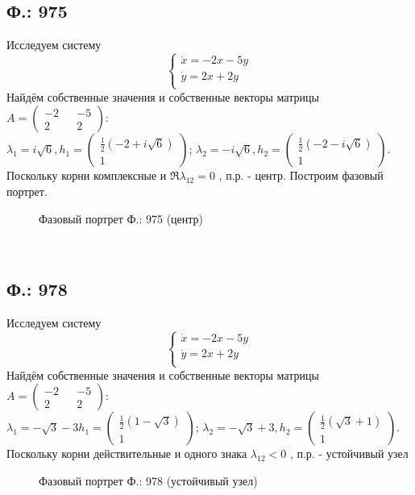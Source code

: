 \documentclass{article}
\begin{document}
\subsection{Ф.: 975}
Исследуем систему 
\begin{equation}
\begin{cases}
        \dot{x}=-2x-5y\\
        \dot{y}=2x+2y\\
    \end{cases}    
\end{equation}
Найдём собственные значения и собственные векторы матрицы $A=\begin{pmatrix}-2 && -5 \\ 2 && 2 \end{pmatrix}$:\\
 $\lambda_1= i\sqrt6,h_1 = \begin{pmatrix} \frac{1}{2} \left(-2+i \sqrt{6}\right)  \\  1 \end{pmatrix} $; $\lambda_2= -i\sqrt6,h_2 = \begin{pmatrix} \frac{1}{2} \left(-2-i \sqrt{6}\right)  \\  1 \end{pmatrix} $. Поскольку корни комплексные и $\Re{\lambda_{12}}=0$ , п.р. - центр. Построим фазовый портрет.
 \begin{figure}[ht]
\caption{Фазовый портрет Ф.: 975 (центр)}
\label{975}
\end{figure}\\

\subsection{Ф.: 978}
Исследуем систему 
\begin{equation}
\begin{cases}
        \dot{x}=-2x-5y\\
        \dot{y}=2x+2y\\
    \end{cases}    
\end{equation}
Найдём собственные значения и собственные векторы матрицы $A=\begin{pmatrix}-2 && -5 \\ 2 && 2 \end{pmatrix}$:\\
 $\lambda_1=-\sqrt{3}-3
 h_1 = \begin{pmatrix} \frac{1}{2} \left(1-\sqrt{3}\right)  \\  1 \end{pmatrix} $; 
 $\lambda_2= -\sqrt{3}+3,
 h_2 = \begin{pmatrix} \frac{1}{2} \left(\sqrt{3}+1\right)  \\  1 \end{pmatrix} $. 
 Поскольку корни действительные и одного знака $\lambda_{12}<0$ 
 , п.р. - устойчивый узел
 \begin{figure}[ht]
\caption{Фазовый портрет Ф.: 978 (устойчивый узел)}
\label{978}
\end{figure}\\
\end{document}
